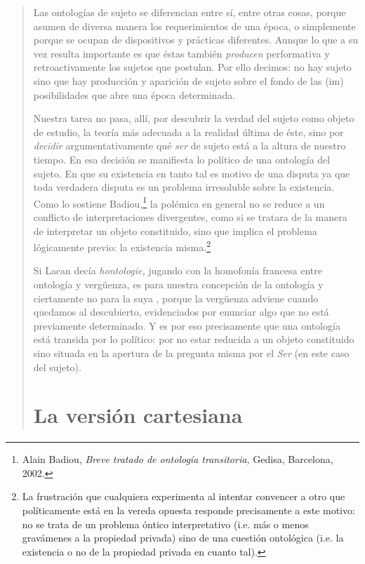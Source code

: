 \begin{quote}
Las ontologías de sujeto se diferencian entre sí, entre otras cosas, porque asumen de diversa manera los requerimientos de una época, o simplemente porque se ocupan de dispositivos y prácticas diferentes. Aunque lo que a su vez resulta importante es que éstas también \emph{producen} performativa y retroactivamente los sujetos que postulan. Por ello decimos: no hay sujeto sino que hay producción y aparición de sujeto sobre el fondo de las (im) posibilidades que abre una época determinada.

Nuestra tarea no pasa, allí, por descubrir la verdad del sujeto como objeto de estudio, la teoría más adecuada a la realidad última de éste, sino por \emph{decidir} argumentativamente qué \emph{ser} de sujeto está a la altura de nuestro tiempo. En esa decisión se manifiesta lo político de una ontología del sujeto. En que su existencia en tanto tal es motivo de una disputa ya que toda verdadera disputa es un problema irresoluble sobre la existencia. Como lo sostiene Badiou,\footnote{Alain Badiou, \emph{Breve tratado de ontología transitoria,} Gedisa, Barcelona, 2002.} la polémica en general no se reduce a un conflicto de interpretaciones divergentes, como si se tratara de la manera de interpretar un objeto constituido, sino que implica el problema lógicamente previo: la existencia misma.\footnote{La frustración que cualquiera experimenta al intentar convencer a otro que políticamente está en la vereda opuesta responde precisamente a este motivo: no se trata de un problema óntico interpretativo (i.e. más o menos gravámenes a la propiedad privada) sino de una cuestión ontológica (i.e. la existencia o no de la propiedad privada en cuanto tal).}

Si Lacan decía \emph{hontologie,} jugando con la homofonía francesa entre ontología y vergüenza, es para nuestra concepción de la ontología y ciertamente no para la suya , porque la vergüenza adviene cuando quedamos al descubierto, evidenciados por enunciar algo que no está previamente determinado. Y es por eso precisamente que una ontología está transida por lo político: por no estar reducida a un objeto constituido sino situada en la apertura de la pregunta misma por el \emph{Ser} (en este caso del sujeto).

\section{La versión cartesiana}


\end{quote}
